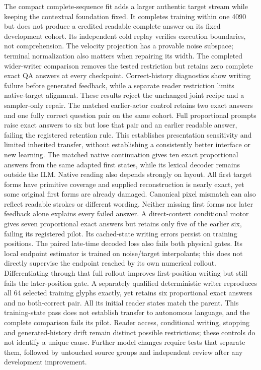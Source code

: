 The compact complete-sequence fit adds a larger authentic target stream while
keeping the contextual foundation fixed. It completes training within one
4090 but does not produce a credited readable complete answer on its fixed
development cohort. Its independent cold replay verifies execution boundaries,
not comprehension. The velocity projection has a provable noise subspace;
terminal normalization also matters when repairing its width. The completed
wider-writer comparison removes the tested restriction but retains zero
complete exact QA answers at every checkpoint. Correct-history diagnostics
show writing failure before generated feedback, while a separate reader
restriction limits native-target alignment. These results reject the unchanged
joint recipe and a sampler-only repair. The matched earlier-actor control
retains two exact answers and one fully correct question pair on the same
cohort. Full proportional prompts raise exact answers to six but lose that
pair and an earlier readable answer, failing the registered retention rule.
This establishes presentation sensitivity and limited inherited transfer,
without establishing a consistently better interface or new learning.
The matched native continuation gives ten exact proportional answers from
the same adapted first states, while its lexical decoder remains outside the
ILM. Native reading also depends strongly on layout. All first target forms
have primitive coverage and supplied reconstruction is nearly exact, yet some
original first forms are already damaged. Canonical pixel mismatch can also
reflect readable strokes or different wording. Neither missing first forms
nor later feedback alone explains every failed answer. A direct-context
conditional motor gives seven proportional exact answers but retains only
five of the earlier six, failing its registered pilot. Its cached-state
writing errors persist on training positions. The paired late-time decoded
loss also fails both physical gates. Its local endpoint estimator is trained
on noise/target interpolants; this does not directly supervise the endpoint
reached by its own numerical rollout. Differentiating through that full
rollout improves first-position writing but still fails the later-position
gate. A separately qualified deterministic writer reproduces all 64 selected
training glyphs exactly, yet retains six proportional exact answers and no
both-correct pair. All its initial reader states match the parent. This
training-state pass does not establish transfer to autonomous language, and
the complete comparison fails its pilot. Reader access, conditional writing,
stopping and generated-history drift remain distinct possible restrictions;
these controls do not identify a unique cause. Further model changes require
tests that separate them, followed by untouched source groups and independent
review after any development improvement.

